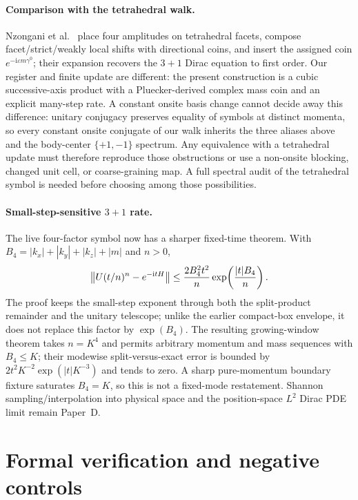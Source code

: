 \documentclass[11pt]{article}
\newcommand{\ii}{\mathrm{i}}
\begin{document}
\paragraph{Comparison with the tetrahedral walk.}
Nzongani et al.~\cite{NzonganiTetra} place four amplitudes on tetrahedral
facets, compose facet/strict/weakly local shifts with directional coins, and
insert the assigned coin $e^{-\ii\varepsilon m\gamma^0}$; their expansion
recovers the $3+1$ Dirac equation to first order.  Our register and finite
update are different: the present construction is a cubic successive-axis
product with a Pluecker-derived complex mass coin and an explicit many-step
rate.  A constant onsite basis change cannot decide away this difference:
unitary conjugacy preserves equality of symbols at distinct momenta, so every
 constant onsite conjugate of our walk inherits the three aliases above and
 the body-center $\{+1,-1\}$ spectrum.  Any equivalence with a tetrahedral update
 must therefore reproduce those obstructions
or use a non-onsite blocking, changed unit cell, or coarse-graining map.  A
full spectral audit of the tetrahedral symbol is needed before choosing among
those possibilities.

\paragraph{Small-step-sensitive $3+1$ rate.}
The live four-factor symbol now has a sharper fixed-time theorem.  With
$B_4=|k_x|+|k_y|+|k_z|+|m|$ and $n>0$,
\[
 \left\|U(t/n)^n-e^{-\ii tH}\right\|
 \leq {2B_4^2t^2\over n}\exp\!\left({|t|B_4\over n}\right).
\]
The proof keeps the small-step exponent through both the split-product
remainder and the unitary telescope; unlike the earlier compact-box envelope,
it does not replace this factor by $\exp(B_4)$.  The resulting growing-window
theorem takes $n=K^4$ and permits arbitrary momentum and mass sequences with
$B_4\leq K$; their modewise split-versus-exact error is bounded by
$2t^2K^{-2}\exp(|t|K^{-3})$ and tends to zero.  A sharp pure-momentum boundary
fixture saturates $B_4=K$, so this is not a fixed-mode restatement.  Shannon
sampling/interpolation into physical space and the position-space $L^2$ Dirac
PDE limit remain Paper~D.

\section{Formal verification and negative controls}
\end{document}
